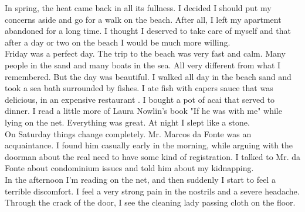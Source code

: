 \documentclass[11pt]{book}
\begin{document}
In spring, the heat came back in all its fullness. I decided I should put my concerns aside and go for a walk on the beach. After all, I left my apartment abandoned for a long time. I thought I deserved to take care of myself and that after a day or two on the beach I would be much more willing. \\

Friday was a perfect day. The trip to the beach was very fast and calm. Many people in the sand and many boats in the sea. All very different from what I remembered. But the day was beautiful. I walked all day in the beach sand and took a sea bath surrounded by fishes. I ate fish with capers sauce that was delicious, in an expensive restaurant . I bought a pot of acai that served to dinner. I read a little more of Laura Nowlin's book "If he was with me" while lying on the net. Everything was great. At night I slept like a stone. \\

On Saturday things change completely. Mr. Marcos da Fonte was an acquaintance. I found him casually early in the morning, while arguing with the doorman about the real need to have some kind of registration. I talked to Mr. da Fonte about condominium issues and told him about my kidnapping. \\

In the afternoon I'm reading on the net, and then suddenly I start to feel a terrible discomfort. I feel a very strong pain in the nostrils and a severe headache. Through the crack of the door, I see the cleaning lady passing cloth on the floor. \\
\end{document}
